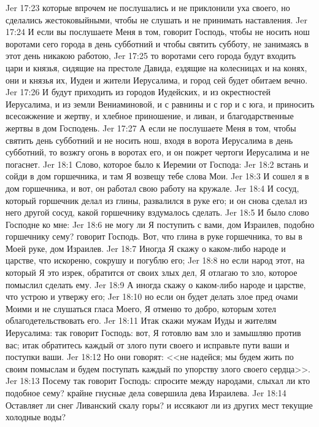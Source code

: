 \vs Jer 17:23 которые впрочем не послушались и не приклонили уха своего, но сделались жестоковыйными, чтобы не слушать и не принимать наставления.
\vs Jer 17:24 И если вы послушаете Меня в том, говорит Господь, чтобы не носить нош воротами сего города в день субботний и чтобы святить субботу, не занимаясь в этот день никакою работою,
\vs Jer 17:25 то воротами сего города будут входить цари и князья, сидящие на престоле Давида, ездящие на колесницах и на конях, они и князья их, Иудеи и жители Иерусалима, и город сей будет обитаем вечно.
\vs Jer 17:26 И будут приходить из городов Иудейских, и из окрестностей Иерусалима, и из земли Вениаминовой, и с равнины и с гор и с юга, и приносить всесожжение и жертву, и хлебное приношение, и ливан, и благодарственные жертвы в дом Господень.
\vs Jer 17:27 А если не послушаете Меня в том, чтобы святить день субботний и не носить нош, входя в ворота Иерусалима в день субботний, то возжгу огонь в воротах его, и он пожрет чертоги Иерусалима и не погаснет.
\vs Jer 18:1 Слово, которое было к Иеремии от Господа:
\vs Jer 18:2 встань и сойди в дом горшечника, и там Я возвещу тебе слова Мои.
\vs Jer 18:3 И сошел я в дом горшечника, и вот, он работал свою работу на кружале.
\vs Jer 18:4 И сосуд, который горшечник делал из глины, развалился в руке его; и он снова сделал из него другой сосуд, какой горшечнику вздумалось сделать.
\vs Jer 18:5 И было слово Господне ко мне:
\vs Jer 18:6 не могу ли Я поступить с вами, дом Израилев, подобно горшечнику сему? говорит Господь. Вот, что глина в руке горшечника, то вы в Моей руке, дом Израилев.
\vs Jer 18:7 Иногда Я скажу о каком-либо народе и царстве, что искореню, сокрушу и погублю его;
\vs Jer 18:8 но если народ этот, на который Я это изрек, обратится от своих злых дел, Я отлагаю то зло, которое помыслил сделать ему.
\vs Jer 18:9 А иногда скажу о каком-либо народе и царстве, что устрою и утвержу его;
\vs Jer 18:10 но если он будет делать злое пред очами Моими и не слушаться гласа Моего, Я отменю то добро, которым хотел облагодетельствовать его.
\vs Jer 18:11 Итак скажи мужам Иуды и жителям Иерусалима: так говорит Господь: вот, Я готовлю вам зло и замышляю против вас; итак обратитесь каждый от злого пути своего и исправьте пути ваши и поступки ваши.
\vs Jer 18:12 Но они говорят: <<не надейся; мы будем жить по своим помыслам и будем поступать каждый по упорству злого своего сердца>>.
\vs Jer 18:13 Посему так говорит Господь: спросите между народами, слыхал ли кто подобное сему? крайне гнусные дела совершила дева Израилева.
\vs Jer 18:14 Оставляет ли снег Ливанский скалу горы? и иссякают ли из других мест текущие холодные воды?
